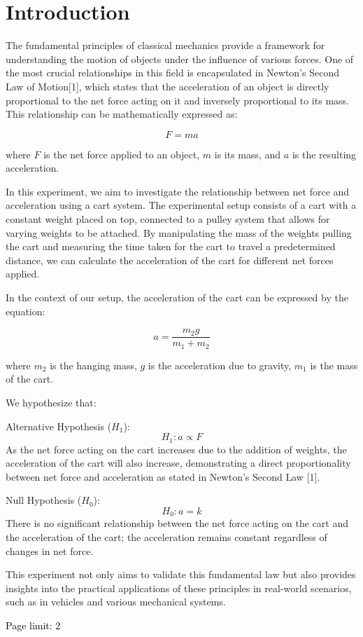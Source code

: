 \section{Introduction}
The fundamental principles of classical mechanics provide a framework for understanding the motion of objects under the influence of various forces. One of the most crucial relationships in this field is encapsulated in Newton's Second Law of Motion[1], which states that the acceleration of an object is directly proportional to the net force acting on it and inversely proportional to its mass. This relationship can be mathematically expressed as:

\begin{equation}
    F = ma
\end{equation}

where \( F \) is the net force applied to an object, \( m \) is its mass, and \( a \) is the resulting acceleration.

In this experiment, we aim to investigate the relationship between net force and acceleration using a cart system. The experimental setup consists of a cart with a constant weight placed on top, connected to a pulley system that allows for varying weights to be attached. By manipulating the mass of the weights pulling the cart and measuring the time taken for the cart to travel a predetermined distance, we can calculate the acceleration of the cart for different net forces applied.

In the context of our setup, the acceleration of the cart can be expressed by the equation:

\begin{equation}
    a = \frac{m_2 g}{m_1 + m_2}
\end{equation}

where \( m_2 \) is the hanging mass, \( g \) is the acceleration due to gravity, \( m_1 \) is the mass of the cart.

We hypothesize that:

Alternative Hypothesis (\( H_1 \)): 
\[
H_1: a \propto F
\]
As the net force acting on the cart increases due to the addition of weights, the acceleration of the cart will also increase, demonstrating a direct proportionality between net force and acceleration as stated in Newton's Second Law [1].

Null Hypothesis (\( H_0 \)): 
\[
H_0: a = k
\]
There is no significant relationship between the net force acting on the cart and the acceleration of the cart; the acceleration remains constant regardless of changes in net force.

This experiment not only aims to validate this fundamental law but also provides insights into the practical applications of these principles in real-world scenarios, such as in vehicles and various mechanical systems.

\textcolor{black}{Page limit: 2}
